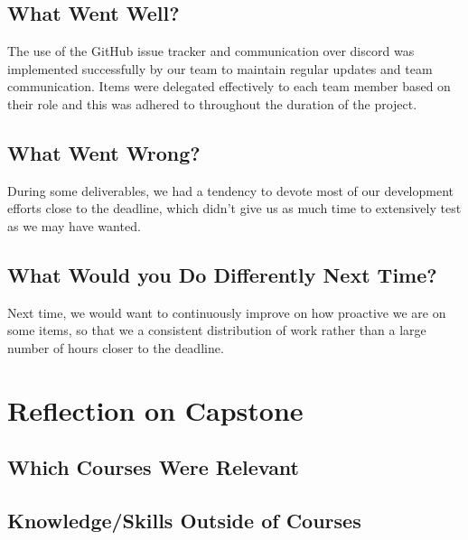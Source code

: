 \documentclass{article}
\begin{document}
\subsection{What Went Well?}

The use of the GitHub issue tracker and communication over discord was implemented successfully by our team to maintain regular
updates and team communication. Items were delegated effectively to each team member based on their role and this was adhered
to throughout the duration of the project.

\subsection{What Went Wrong?}

During some deliverables, we had a tendency to devote most of our development efforts close to the deadline, which didn't give
us as much time to extensively test as we may have wanted.

\subsection{What Would you Do Differently Next Time?}

Next time, we would want to continuously improve on how proactive we are on some items, so that we a consistent distribution of work
rather than a large number of hours closer to the deadline.

\section{Reflection on Capstone}

\subsection{Which Courses Were Relevant}


\subsection{Knowledge/Skills Outside of Courses}

\end{document}
